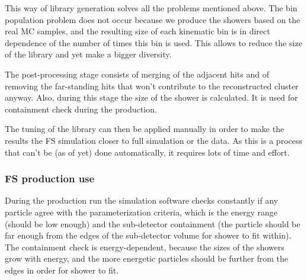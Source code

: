 \begin{figure}[htb]
\end{figure}

This way of library generation solves all the problems mentioned above. The bin population problem does not occur because we produce the showers based on the real MC samples, and the resulting size of each kinematic bin is in direct dependence of the number of times this bin is used. This allows to reduce the size of the library and yet make a bigger diversity.

The post-processing stage consists of merging of the adjacent hits and of removing the far-standing hits that won't contribute to the reconstructed cluster anyway. Also, during this stage the size of the shower is calculated. It is used for containment check during the production.

The tuning of the library can then be applied manually in order to make the results the FS simulation closer to full simulation or the data. As this is a process that can't be (as of yet) done automatically, it requires lots of time and effort.

\subsubsection{FS production use}
\label{sec:MC_FS_prod}

During the production run the simulation software checks constantly if any particle agree with the parameterization criteria, which is the energy range (should be low enough) and the sub-detector containment (the particle should be far enough from the edges of the sub-detector volume for shower to fit within). The containment check is energy-dependent, because the sizes of the showers grow with energy, and the more energetic particles should be further from the edges in order for shower to fit.

